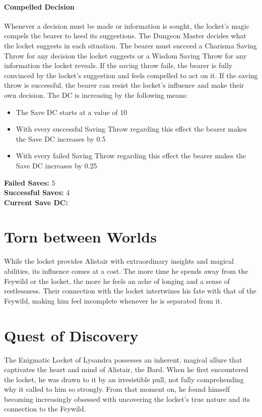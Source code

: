 \documentclass[letterpaper,openany,oneside,twocolumn]{book}
\begin{document}
\paragraph{Compelled Decision}
Whenever a decision must be made or information is sought, the locket's magic compels the bearer to heed its suggestions. The Dungeon Master decides what the locket suggests in each situation. The bearer must succeed a Charisma Saving Throw for any decision the locket suggests or a Wisdom Saving Throw for any information the locket reveals. If the saving throw fails, the bearer is fully convinced by the locket's suggestion and feels compelled to act on it. If the saving throw is successful, the bearer can resist the locket's influence and make their own decision. The DC is increasing by the following means:
\eject
\begin{itemize}
	\item The Save DC starts at a value of 10
	\item With every successful Saving Throw regarding this effect the bearer makes the Save DC increases by \xdef\successIncrease{0.5}\successIncrease
	\item With every failed Saving Throw regarding this effect the bearer makes the Save DC increases by \xdef\failIncrease{0.25}\failIncrease
\end{itemize}
\textbf{Failed Saves:} \xdef\failedSaves{5}\failedSaves\\
\textbf{Successful Saves:} \xdef\successSaves{4}\successSaves\\
\textbf{Current Save DC: \FPeval{saveDC}{clip(10+\failedSaves*failIncrease+\successSaves*\successIncrease)}\saveDC}
\section*{Torn between Worlds}
While the locket provides Alistair with extraordinary insights and magical abilities, its influence comes at a cost. The more time he spends away from the Feywild or the locket, the more he feels an ache of longing and a sense of restlessness. Their connection with the locket intertwines his fate with that of the Feywild, making him feel incomplete whenever he is separated from it.
\section*{Quest of Discovery}
The Enigmatic Locket of Lysandra possesses an inherent, magical allure that captivates the heart and mind of Alistair, the Bard. When he first encountered the locket, he was drawn to it by an irresistible pull, not fully comprehending why it called to him so strongly. From that moment on, he found himself becoming increasingly obsessed with uncovering the locket's true nature and its connection to the Feywild.
\end{document}
